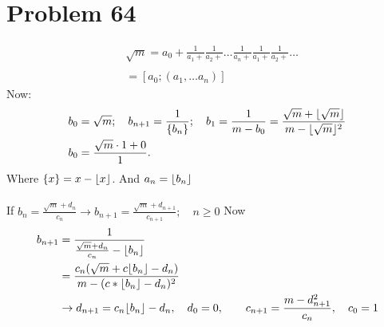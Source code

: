 \documentclass[12pt]{article}
\DeclarePairedDelimiter\floor{\lfloor}{\rfloor}
\begin{document}
\section*{Problem 64}
\begin{align*}
    &\sqrt{m} = a_0+\frac{1}{a_1+} \frac{1}{a_2+} \ldots \frac{1}{a_n+} \frac{1}{a_1+} \frac{1}{a_2+} \ldots \\\\
    &= [a_0; (a_1,\ldots a_n)]
\end{align*}
Now:
\begin{align*}
    &b_0  = \sqrt{m}; \quad b_{n+1} = \frac{1}{\{ b_n\}}; \quad b_1 = \frac{1}{m-b_0} = \frac{\sqrt{m} + \floor{\sqrt{m}}}{m-\floor{\sqrt{m}}^2} \\
    &b_0 = \frac{\sqrt{m}\cdot1+0}{1}.
\end{align*}
Where $\{x \} = x - \floor{x}$. And $a_n = \floor*{b_n}$\\\\
If $b_n = \frac{\sqrt{m} + d_n}{c_n} \rightarrow b_{n+1} = \frac{\sqrt{m} + d_{n+1}}{c_{n+1}}; \quad n \geq 0$
Now
\begin{align*}
    b_{n+1} &= \frac{1}{\frac{\sqrt{m}+d_n}{c_n} - \floor{b_n}} \\
    &= \frac{c_n(\sqrt{m}+c\floor{b_n}-d_n)}{m-(c*\floor{b_n}-d_n)^2} \\
    &\rightarrow d_{n+1} = c_n\floor{b_n}-d_n, \quad d_0 = 0, \quad \quad c_{n+1} = \frac{m-d_{n+1}^2}{c_n}, \quad c_0 = 1
\end{align*}
\end{document}
